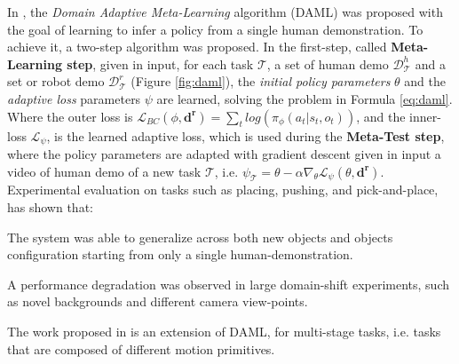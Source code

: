 \newline In \cite{yu2018daml}, the \textit{Domain Adaptive Meta-Learning} algorithm (DAML) was proposed with the goal of learning to infer a policy from a single human demonstration. To achieve it, a two-step algorithm was proposed. In the first-step, called \textbf{Meta-Learning step}, given in input, for each task $\mathcal{T}$, a set of human demo $\mathcal{D}^{h}_{\mathcal{T}}$ and a set or robot demo $\mathcal{D}^{r}_{\mathcal{T}}$ (Figure \ref{fig:daml}), the \textit{initial policy parameters} $\theta$ and the \textit{adaptive loss} parameters $\psi$ are learned, solving the problem in Formula \ref{eq:daml}. 
\newline Where the outer loss is $\mathcal{L}_{BC}(\phi,\mathbf{d^{r}}) = \sum_{t} log(\pi_{\phi}(a_{t}|s_{t},o_{t}))$, and the inner-loss $\mathcal{L}_{\psi}$, is the learned adaptive loss, which is used during the \textbf{Meta-Test step}, where the policy parameters are adapted with gradient descent given in input a video of human demo of a new task $\mathcal{T}$, i.e. $\psi_{\mathcal{T}} = \theta - \alpha \nabla_{\theta} \mathcal{L}_{\psi}(\theta, \mathbf{d^{r}})$. Experimental evaluation on tasks such as placing, pushing, and pick-and-place, has shown that: \begin{enumerate*}[label=\textbf{(\alph*)}]
    \item The system was able to generalize across both new objects and objects configuration starting from only a single human-demonstration.
    \item A performance degradation was observed in large domain-shift experiments, such as novel backgrounds and different camera view-points.
\end{enumerate*}
The work proposed in \cite{yu2018one_shot_hil} is an extension of DAML, for multi-stage tasks, i.e. tasks that are composed of different motion primitives. 

